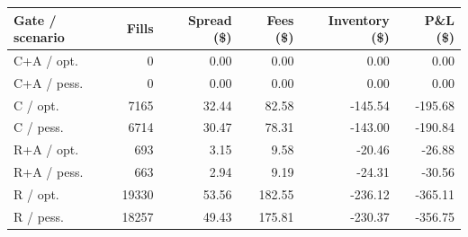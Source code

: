 \begin{tabular}{lrrrrr}
\toprule
Gate / scenario & Fills & Spread (\$) & Fees (\$) & Inventory (\$) & P\&L (\$) \\
\midrule
C+A / opt. & 0 & 0.00 & 0.00 & 0.00 & 0.00 \\
C+A / pess. & 0 & 0.00 & 0.00 & 0.00 & 0.00 \\
C / opt. & 7165 & 32.44 & 82.58 & -145.54 & -195.68 \\
C / pess. & 6714 & 30.47 & 78.31 & -143.00 & -190.84 \\
R+A / opt. & 693 & 3.15 & 9.58 & -20.46 & -26.88 \\
R+A / pess. & 663 & 2.94 & 9.19 & -24.31 & -30.56 \\
R / opt. & 19330 & 53.56 & 182.55 & -236.12 & -365.11 \\
R / pess. & 18257 & 49.43 & 175.81 & -230.37 & -356.75 \\
\bottomrule
\end{tabular}
